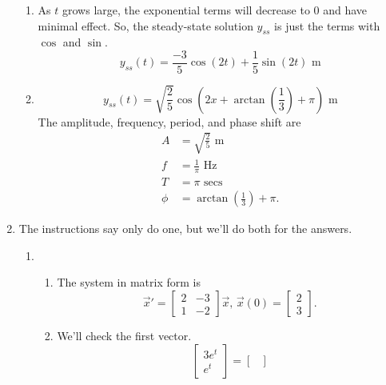 \begin{enumerate}[label=\arabic*.]
\begin{enumerate}[label=(\alph*)]
				\item
					As $t$ grows large, the exponential terms will decrease to 0 and have minimal effect.
					So, the steady-state solution $y_{ss}$ is just the terms with $\cos$ and $\sin$.
					\begin{equation*}
						y_{ss}(t) = \frac{-3}{5}\cos{(2t)} + \frac{1}{5}\sin{(2t)} \text{ m}
					\end{equation*}
				\item
					\begin{equation*}
						y_{ss}(t) = \sqrt{\frac{2}{5}}\cos{\left(2x + \arctan{\left(\frac{1}{3}\right)} + \pi\right)} \text{ m}
					\end{equation*}
					The amplitude, frequency, period, and phase shift are
					\begin{align*}
						A &= \sqrt{\frac{2}{5}} \text{ m} \\
						f &= \frac{1}{\pi} \text{ Hz} \\
						T &= \pi \text{ secs} \\
						\phi &= \arctan{\left(\frac{1}{3}\right)} + \pi.
					\end{align*}
			\end{enumerate}
		\item
			The instructions say only do one, but we'll do both for the answers.
			\begin{enumerate}[label=(\alph*)]
				\item
					\begin{enumerate}[label=(\roman*)]
						\item
							The system in matrix form is
							\begin{equation*}
								\vec{x}' = \begin{bmatrix}
									2 & -3 \\
									1 & -2
								\end{bmatrix}\vec{x} \text{, } \vec{x}(0) = \begin{bmatrix}
									2 \\
									3
								\end{bmatrix}.
							\end{equation*}
						\item
							We'll check the first vector.
							\begin{equation*}
								\begin{bmatrix}
									3e^t \\
									e^t
								\end{bmatrix} = \begin{bmatrix}

\end{bmatrix}
\end{equation*}
\end{enumerate}
\end{enumerate}
\end{enumerate}
